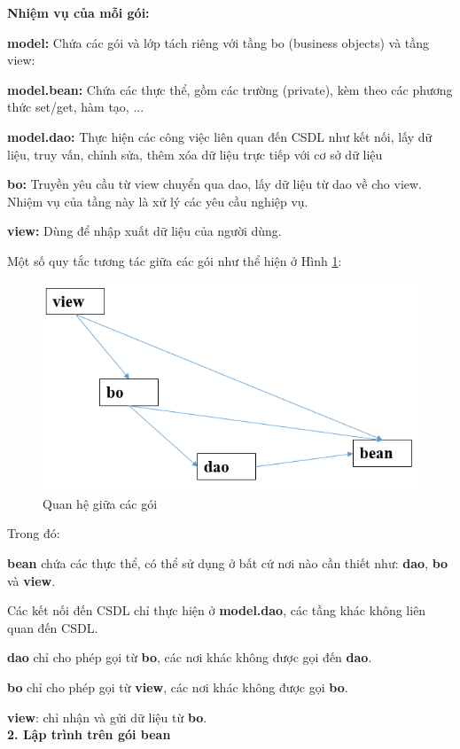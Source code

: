 \textbf{Nhiệm vụ của mỗi gói:}

\textbf{model:} Chứa các gói và lớp tách riêng với tầng bo (business objects) và tầng view:

\textbf{model.bean: } Chứa các thực thể, gồm các trường (private), kèm theo các phương thức set/get, hàm tạo, ...

\textbf{model.dao:} Thực hiện các công việc liên quan đến CSDL như kết nối, lấy dữ liệu, truy vấn, chỉnh sửa, thêm xóa dữ liệu trực tiếp với cơ sở dữ liệu

\textbf{bo: }
Truyền yêu cầu từ view chuyển qua dao, lấy dữ liệu từ dao về cho view. Nhiệm vụ của tầng này là xử lý các yêu cầu nghiệp vụ.

\textbf{view:} Dùng để nhập xuất dữ liệu của người dùng.

Một số quy tắc tương tác giữa các gói như thể hiện ở Hình \ref{hinh319}:
	\begin{figure}[!ht]
	\centering
	\includegraphics[scale=0.9]{Figures//Hinh319.png}
	\caption{ Quan hệ giữa các gói }\label{hinh319} 
\end{figure}

Trong đó:

\textbf{bean} chứa các thực thể, có thể sử dụng ở bất cứ nơi nào cần thiết như: \textbf{dao}, \textbf{bo} và \textbf{view}.

Các kết nối đến CSDL chỉ thực hiện ở \textbf{model.dao}, các tầng khác không liên quan đến CSDL.

\textbf{dao} chỉ cho phép gọi từ \textbf{bo}, các nơi khác không được gọi đến \textbf{dao}.

\textbf{bo} chỉ cho phép gọi từ \textbf{view}, các nơi khác không được gọi \textbf{bo}.

\textbf{view}: chỉ nhận và gửi dữ liệu từ \textbf{bo}.\\
\textbf{2. Lập trình trên gói bean}

